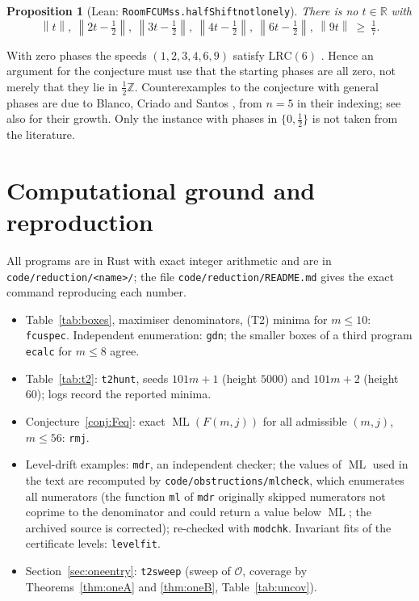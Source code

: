 \documentclass[11pt]{amsart}
\theoremstyle{plain}
\newtheorem{proposition}[theorem]{Proposition}
\theoremstyle{definition}
\theoremstyle{remark}
\newcommand{\nrm}[1]{\left\lVert #1 \right\rVert}
\newcommand{\ML}{\operatorname{ML}}
\newcommand{\Z}{\mathbb{Z}}
\newcommand{\R}{\mathbb{R}}
\newcommand{\lean}[1]{{\def\_{\textunderscore\allowbreak}\def\.{.\allowbreak}\texttt{#1}}}
\newcommand{\LRC}{\mathrm{LRC}}
\begin{document}
\begin{proposition}[Lean: \lean{RoomFCUMss\.halfShift\_not\_lonely}]\label{prop:half}
There is no $t\in\R$ with
\[
  \nrm{t},\ \nrm{2t-\tfrac12},\ \nrm{3t-\tfrac12},\ \nrm{4t-\tfrac12},\ \nrm{6t-\tfrac12},\ \nrm{9t}
  \ \ge\ \tfrac17 .
\]
\end{proposition}

With zero phases the speeds $(1,2,3,4,6,9)$ satisfy $\LRC(6)$ \cite{bs}. Hence an argument for the
conjecture must use that the starting phases are all zero, not merely that they lie in
$\frac12\Z$. Counterexamples to the conjecture with general phases are due to Blanco, Criado and
Santos \cite{bcs}, from $n=5$ in their indexing; see also \cite{poliakova} for their growth. Only the instance
with phases in $\{0,\frac12\}$ is not taken from the literature.

\appendix
\section{Computational ground and reproduction}\label{app:data}

All programs are in Rust with exact integer arithmetic and are in
\texttt{code/reduction/<name>/}; the file \texttt{code/reduction/README.md} gives the exact
command reproducing each number.
\begin{itemize}
\item Table~\ref{tab:boxes}, maximiser denominators, (T2) minima for $m\le10$: \texttt{fcuspec}.
Independent enumeration: \texttt{gdn}; the smaller boxes of a third program \texttt{ecalc} for
$m\le8$ agree.
\item Table~\ref{tab:t2}: \texttt{t2hunt}, seeds $101m+1$ (height $5000$) and $101m+2$ (height
$60$); logs record the reported minima.
\item Conjecture~\ref{conj:Feq}: exact $\ML(F(m,j))$ for all admissible $(m,j)$, $m\le 56$:
\texttt{rmj}.
\item Level-drift examples: \texttt{mdr}, an independent checker; the values of $\ML$ used in the text are recomputed by
\texttt{code/obstructions/mlcheck}, which enumerates all numerators (the function \texttt{ml} of \texttt{mdr} originally skipped numerators not coprime
to the denominator and could return a value below $\ML$; the archived source is corrected); re-checked with \texttt{modchk}. Invariant fits of
the certificate levels: \texttt{levelfit}.
\item Section~\ref{sec:oneentry}: \texttt{t2sweep} (sweep of $\mathcal O$, coverage by
Theorems~\ref{thm:oneA} and \ref{thm:oneB}, Table~\ref{tab:uncov}).
\end{itemize}
\end{document}
